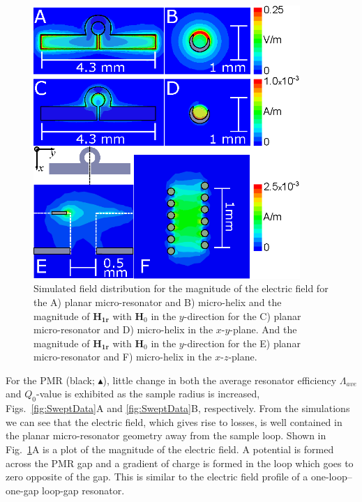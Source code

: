 \begin{figure}[ht]
 \centering
 \includegraphics[width=0.9\textwidth]{Kapitel/Ch2-Images/Ch2-AnsysFields.eps}
 \caption[Simulated field distribution for Helix and PMR.]{Simulated field distribution for the magnitude of the electric field for the A) planar micro-resonator and B) micro-helix and the magnitude of $\mathbf{H_{1r}}$ with $\mathbf{H}_0$ in the $y$-direction for the C) planar micro-resonator and D) micro-helix in the $x$-$y$-plane. And the magnitude of $\mathbf{H_{1r}}$ with $\mathbf{H}_0$ in the $y$-direction for the E) planar micro-resonator and F) micro-helix in the $x$-$z$-plane. }
 \label{ch2-fig:FieldData}
\end{figure}

For the PMR (black; $\blacktriangle$), little change in both the average resonator efficiency $\Lambda_{ave}$ and $Q_0$-value is exhibited as the sample radius is increased, Figs.~\ref{fig:SweptData}A and \ref{fig:SweptData}B, respectively. From the simulations we can see that the electric field, which gives rise to losses, is well contained in the planar micro-resonator geometry away from the sample loop. Shown in Fig.~\ref{ch2-fig:FieldData}A is a plot of the magnitude of the electric field. A potential is formed across the PMR gap and a gradient of charge is formed in the loop which goes to zero opposite of the gap. This is similar to the electric field profile of a one-loop--one-gap loop-gap resonator.  

